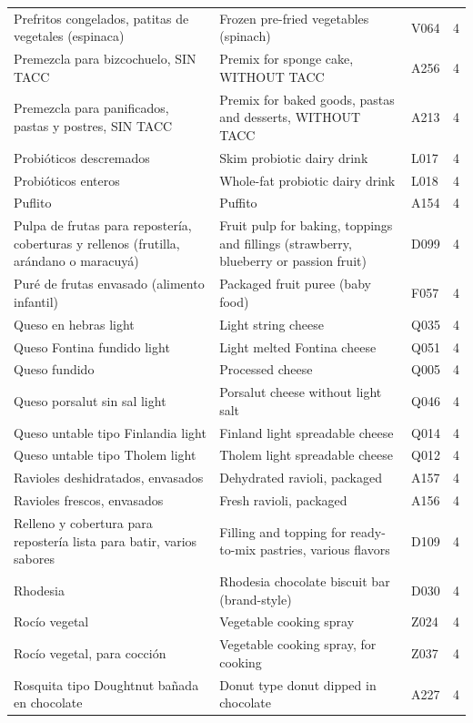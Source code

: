 {\begin{longtable}{p{4.3cm}p{5.5cm}p{1.5cm}p{0.7cm}}
Prefritos congelados, patitas de vegetales (espinaca) & Frozen pre-fried vegetables (spinach) & V064 & 4\\
Premezcla para bizcochuelo, SIN TACC & Premix for sponge cake, WITHOUT TACC & A256 & 4\\
Premezcla para panificados, pastas y postres, SIN TACC & Premix for baked goods, pastas and desserts, WITHOUT TACC & A213 & 4\\
Probióticos descremados & Skim probiotic dairy drink & L017 & 4\\
Probióticos enteros & Whole-fat probiotic dairy drink & L018 & 4\\
Puflito & Puffito & A154 & 4\\
Pulpa de frutas para repostería, coberturas y rellenos (frutilla, arándano o maracuyá) & Fruit pulp for baking, toppings and fillings (strawberry, blueberry or passion fruit) & D099 & 4\\
Puré de frutas envasado (alimento infantil) & Packaged fruit puree (baby food) & F057 & 4\\
Queso en hebras light & Light string cheese & Q035 & 4\\
Queso Fontina fundido light & Light melted Fontina cheese & Q051 & 4\\
Queso fundido & Processed cheese & Q005 & 4\\
Queso porsalut sin sal light & Porsalut cheese without light salt & Q046 & 4\\
Queso untable tipo Finlandia light & Finland light spreadable cheese & Q014 & 4\\
Queso untable tipo Tholem light & Tholem light spreadable cheese & Q012 & 4\\
Ravioles deshidratados, envasados & Dehydrated ravioli, packaged & A157 & 4\\
Ravioles frescos, envasados & Fresh ravioli, packaged & A156 & 4\\
Relleno y cobertura para repostería lista para batir, varios sabores & Filling and topping for ready-to-mix pastries, various flavors & D109 & 4\\
Rhodesia & Rhodesia chocolate biscuit bar (brand-style) & D030 & 4\\
Rocío vegetal & Vegetable cooking spray & Z024 & 4\\
Rocío vegetal, para cocción & Vegetable cooking spray, for cooking & Z037 & 4\\
Rosquita tipo Doughtnut bañada en chocolate & Donut type donut dipped in chocolate & A227 & 4\\

\end{longtable}}
